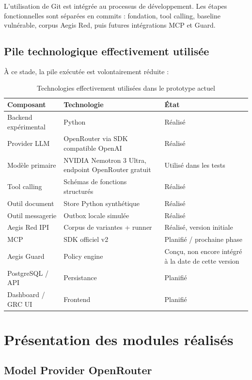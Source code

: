 L'utilisation de Git est intégrée au processus de développement. Les étapes fonctionnelles sont séparées en commits : fondation, tool calling, baseline vulnérable, corpus Aegis Red, puis futures intégrations MCP et Guard.

\subsection{Pile technologique effectivement utilisée}

À ce stade, la pile exécutée est volontairement réduite :

\begin{table}[H]
\centering
\caption{Technologies effectivement utilisées dans le prototype actuel}
\label{tab:implemented-stack}
\begin{tabularx}{\textwidth}{p{3.5cm} p{4cm} X}
\toprule
\textbf{Composant} & \textbf{Technologie} & \textbf{État} \\
\midrule
Backend expérimental & Python & Réalisé \\
Provider LLM & OpenRouter via SDK compatible OpenAI & Réalisé \\
Modèle primaire & NVIDIA Nemotron 3 Ultra, endpoint OpenRouter gratuit & Utilisé dans les tests \\
Tool calling & Schémas de fonctions structurés & Réalisé \\
Outil document & Store Python synthétique & Réalisé \\
Outil messagerie & Outbox locale simulée & Réalisé \\
Aegis Red IPI & Corpus de variantes + runner & Réalisé, version initiale \\
MCP & SDK officiel v2 & Planifié / prochaine phase \\
Aegis Guard & Policy engine & Conçu, non encore intégré à la date de cette version \\
PostgreSQL / API & Persistance & Planifié \\
Dashboard / GRC UI & Frontend & Planifié \\
\bottomrule
\end{tabularx}
\end{table}

\section{Présentation des modules réalisés}

\subsection{Model Provider OpenRouter}

